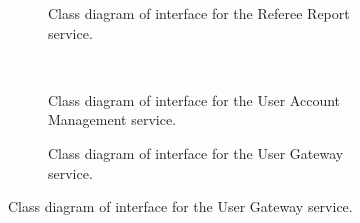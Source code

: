 \documentclass[12pt]{article}
\begin{document}
\begin{figure}[H]
\begin{subfigure}[H]{0.47\textwidth}
\centering	
{}
\caption{Class diagram of interface for the Referee Report service.}
\end{subfigure}
~
\begin{subfigure}[H]{0.47\textwidth}
\centering	
{}
\caption{Class diagram of interface for the User Account Management service.}
\end{subfigure}

\begin{subfigure}[H]{0.47\textwidth}
\centering	
{}
\caption{Class diagram of interface for the User Gateway service.}
\end{subfigure}

\end{figure}
\end{document}
